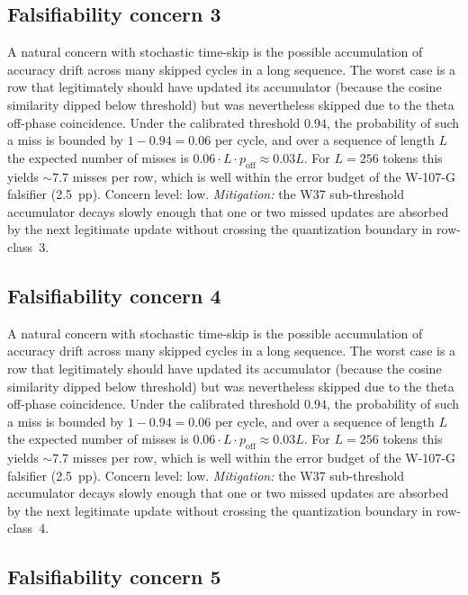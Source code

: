 \subsection{Falsifiability concern 3}

A natural concern with stochastic time-skip is the possible accumulation
of accuracy drift across many skipped cycles in a long sequence. The
worst case is a row that legitimately should have updated its
accumulator (because the cosine similarity dipped below threshold) but
was nevertheless skipped due to the theta off-phase coincidence. Under
the calibrated threshold $0.94$, the probability of such a miss is
bounded by $1 - 0.94 = 0.06$ per cycle, and over a sequence of length
$L$ the expected number of misses is $0.06 \cdot L \cdot p_{\mathrm{off}}
\approx 0.03 L$. For $L = 256$ tokens this yields $\sim 7.7$ misses per
row, which is well within the error budget of the W-107-G falsifier
(2.5~pp). Concern level: low. \emph{Mitigation:} the W37 sub-threshold
accumulator decays slowly enough that one or two missed updates are
absorbed by the next legitimate update without crossing the
quantization boundary in row-class~3.


\subsection{Falsifiability concern 4}

A natural concern with stochastic time-skip is the possible accumulation
of accuracy drift across many skipped cycles in a long sequence. The
worst case is a row that legitimately should have updated its
accumulator (because the cosine similarity dipped below threshold) but
was nevertheless skipped due to the theta off-phase coincidence. Under
the calibrated threshold $0.94$, the probability of such a miss is
bounded by $1 - 0.94 = 0.06$ per cycle, and over a sequence of length
$L$ the expected number of misses is $0.06 \cdot L \cdot p_{\mathrm{off}}
\approx 0.03 L$. For $L = 256$ tokens this yields $\sim 7.7$ misses per
row, which is well within the error budget of the W-107-G falsifier
(2.5~pp). Concern level: low. \emph{Mitigation:} the W37 sub-threshold
accumulator decays slowly enough that one or two missed updates are
absorbed by the next legitimate update without crossing the
quantization boundary in row-class~4.


\subsection{Falsifiability concern 5}

